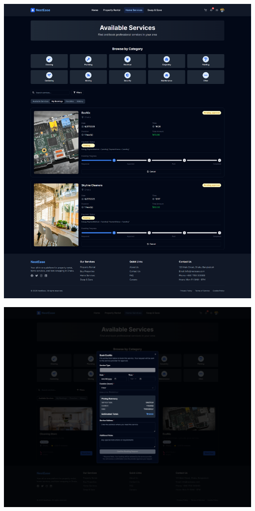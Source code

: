 \documentclass[conference]{IEEEtran}
\begin{document}
\begin{center}
\noindent
\begin{minipage}[t]{0.45\textwidth}
\includegraphics[width=\linewidth]{Project Screenshot/Service My Bookings.png}
\end{minipage} \hfill
\begin{minipage}[t]{0.45\textwidth}
\includegraphics[width=\linewidth]{Project Screenshot/Service Book Now.png}
\end{minipage}


\end{center}
\end{document}
